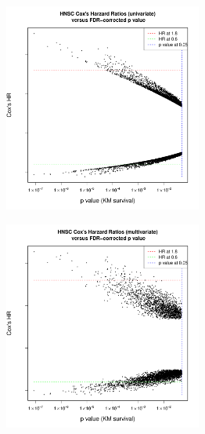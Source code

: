 \documentclass[
paper=landscape,
paper=160mm:90mm, %
fontsize=11pt, %
pagesize, %
parskip=half-, %
]{scrartcl} %
\theoremstyle{mythmstyle} %
\begin{document}
\begin{figure}[ht]


    \begin{subfigure}[t]{0.45\textwidth}
        \includegraphics[width=6.5cm]{Rplot02_FDRP_uniHR.pdf}  %

    \end{subfigure} \hfill
    \begin{subfigure}[t]{0.45\textwidth}
        \includegraphics[width=6.5cm]{Rplot02_FDRP_multiHR.pdf}
    \end{subfigure} \\


\end{figure}
\end{document}
